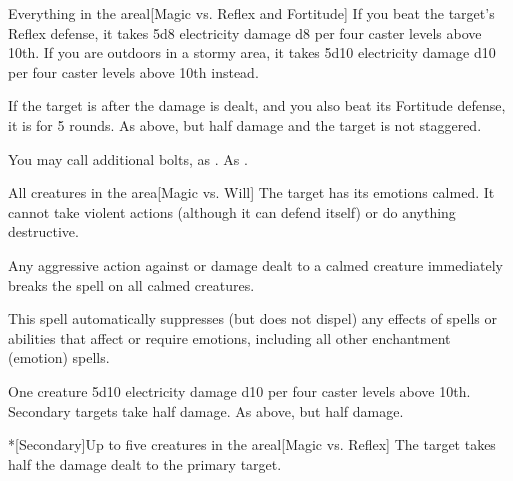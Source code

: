 \begin{spelltargets}{Everything in the area}l[Magic vs. Reflex and Fortitude]
    \spellsuccess If you beat the target's Reflex defense, it takes 5d8 electricity damage \add d8 per four caster levels above 10th. If you are outdoors in a stormy area, it takes 5d10 electricity damage \add d10 per four caster levels above 10th instead.

    If the target is \bloodied after the damage is dealt, and you also beat its Fortitude defense, it is \staggered for 5 rounds.
    \spellfailure As above, but half damage and the target is not staggered.
\end{spelltargets}
\spelleffect You may call additional bolts, as .
\spellnotes As .

\begin{spelltargets}{All creatures in the area}[Magic vs. Will]
    \spellsuccess The target has its emotions calmed. It cannot take violent actions (although it can defend itself) or do anything destructive.
\end{spelltargets}
\spellnotes Any aggressive action against or damage dealt to a calmed creature immediately breaks the spell on all calmed creatures.

This spell automatically suppresses (but does not dispel) any effects of spells or abilities that affect or require emotions, including all other enchantment (emotion) spells.

\spellrng{\rngmed}
\begin{spelltarget}[Primary]{One creature}
    \spellsuccess 5d10 electricity damage \add d10 per four caster levels above 10th. Secondary targets take half damage.
    \spellfailure As above, but half damage.
\end{spelltarget}
\begin{spelltargets}*[Secondary]{Up to five creatures in the area}l[Magic vs. Reflex]
    \spellsuccess The target takes half the damage dealt to the primary target.
\end{spelltargets}

